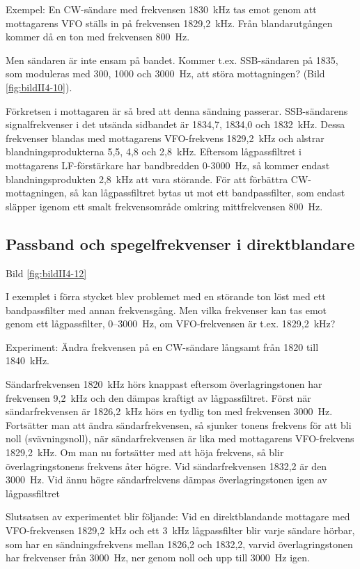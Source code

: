 Exempel: En CW-sändare med frekvensen 1830~kHz tas emot genom att
mottagarens VFO ställs in på frekvensen 1829,2~kHz. Från
blandarutgången kommer då en ton med frekvensen 800~Hz.

Men sändaren är inte ensam på bandet.  Kommer t.ex. SSB-sändaren på
1835, som moduleras med 300, 1000 och 3000~Hz, att störa mottagningen?
(Bild \ref{fig:bildII4-10}).

Förkretsen i mottagaren är så bred att denna sändning
passerar. SSB-sändarens signalfrekvenser i det utsända sidbandet är
1834,7, 1834,0 och 1832~kHz. Dessa frekvenser blandas med mottagarens
VFO-frekvens 1829,2~kHz och alstrar blandningsprodukterna 5,5, 4,8 och
2,8~kHz. Eftersom lågpassfiltret i mottagarens LF-förstärkare har
bandbredden 0-3000~Hz, så kommer endast blandningsprodukten 2,8~kHz
att vara störande. För att förbättra CW-mottagningen, så kan
lågpassfiltret bytas ut mot ett bandpassfilter, som endast släpper
igenom ett smalt frekvensområde omkring mittfrekvensen 800~Hz.

\subsection{Passband och spegelfrekvenser i direktblandare}

Bild \ref{fig:bildII4-12}

I exemplet i förra stycket blev problemet med en störande ton löst med
ett bandpassfilter med annan frekvensgång.  Men vilka frekvenser kan
tas emot genom ett lågpassfilter, 0--3000~Hz, om VFO-frekvensen är
t.ex. 1829,2~kHz?


Experiment: Ändra frekvensen på en CW-sändare långsamt från 1820 till
1840~kHz.

Sändarfrekvensen 1820~kHz hörs knappast eftersom överlagringstonen har
frekvensen 9,2~kHz och den dämpas kraftigt av lågpassfiltret. Först
när sändarfrekvensen är 1826,2~kHz hörs en tydlig ton med frekvensen
3000~Hz. Fortsätter man att ändra sändarfrekvensen, så sjunker tonens
frekvens för att bli noll (svävningsnoll), när sändarfrekvensen är
lika med mottagarens VFO-frekvens 1829,2~kHz. Om man nu fortsätter med
att höja frekvens, så blir överlagringstonens frekvens åter högre. Vid
sändarfrekvensen 1832,2 är den 3000~Hz. Vid ännu högre sändarfrekvens
dämpas överlagringstonen igen av lågpassfiltret

Slutsatsen av experimentet blir följande: Vid en direktblandande
mottagare med VFO-frekvensen 1829,2~kHz och ett 3~kHz lågpassfilter
blir varje sändare hörbar, som har en sändningsfrekvens mellan 1826,2
och 1832,2, varvid överlagringstonen har frekvenser från 3000~Hz, ner
genom noll och upp till 3000~Hz igen.

